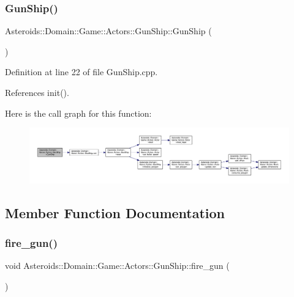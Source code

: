 \subsubsection{\texorpdfstring{Gun\+Ship()}{GunShip()}}
{\footnotesize\ttfamily Asteroids\+::\+Domain\+::\+Game\+::\+Actors\+::\+Gun\+Ship\+::\+Gun\+Ship (\begin{DoxyParamCaption}{ }\end{DoxyParamCaption})}



Definition at line 22 of file Gun\+Ship.\+cpp.



References init().

Here is the call graph for this function\+:\nopagebreak
\begin{figure}[H]
\begin{center}
\leavevmode
\includegraphics[width=350pt]{classAsteroids_1_1Domain_1_1Game_1_1Actors_1_1GunShip_a4e6a5de697b5a88bf3942165397cd27b_cgraph}
\end{center}
\end{figure}


\subsection{Member Function Documentation}
\mbox{\label{classAsteroids_1_1Domain_1_1Game_1_1Actors_1_1GunShip_a9ab9a00f7d3c5f241b8a2a36c146864f}} 
\subsubsection{\texorpdfstring{fire\+\_\+gun()}{fire\_gun()}}
{\footnotesize\ttfamily void Asteroids\+::\+Domain\+::\+Game\+::\+Actors\+::\+Gun\+Ship\+::fire\+\_\+gun (\begin{DoxyParamCaption}{ }\end{DoxyParamCaption})\hspace{0.3cm}{\ttfamily [private]}}

